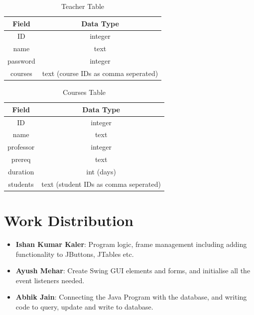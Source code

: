 \documentclass[12pt, a4paper]{article}
\begin{document}
\begin{table}[h]
	\centering
	\label{tab:teacher}
	\begin{tabular}{ c|c }
		\textbf{Field}	& \textbf{Data Type} \\
		\hline
		ID				& integer \\
		name 			& text \\
		password		& integer \\
		courses			& text (course IDs as comma seperated)
	\end{tabular}
	\caption{Teacher Table}
\end{table}
\vspace*{2.5cm}

\begin{table}[h]
	\centering
	\label{tab:courses}
	\begin{tabular}{ c|c }
		\textbf{Field}	& \textbf{Data Type} \\
		\hline
		ID				& integer \\
		name 			& text \\
		professor		& integer \\
		prereq			& text \\
		duration 		& int (days) \\
		students 		& text (student IDs as comma seperated)
	\end{tabular}
	\caption{Courses Table}
\end{table}

\newpage

\section{Work Distribution}

\begin{itemize}
	\item \textbf{Ishan Kumar Kaler}: Program logic, frame management including adding functionality to JButtons, JTables etc.
	\item \textbf{Ayush Mehar}: Create Swing GUI elements and forms, and initialise all the event listeners needed.
	\item \textbf{Abhik Jain}: Connecting the Java Program with the database, and writing code to query, update and write to database.
\end{itemize}
\end{document}
